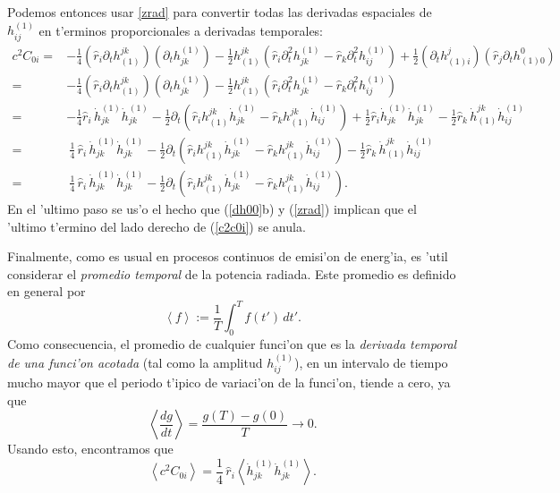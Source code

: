 Podemos entonces usar \eqref{zrad} para convertir todas las derivadas espaciales de $h^{(1)}_{ij}$ en t'erminos proporcionales a derivadas temporales:
\begin{align}
c^2C_{0i} = & -\frac{1}{4}(\hat{r}_i\partial_t h^{jk}_{(1)})(\partial_t h_{jk}^{(1)})
-\frac{1}{2}h^{jk}_{(1)}\left(\hat{r}_i\partial^2_t h^{(1)}_{jk}-\hat{r}_k\partial^2_t
h^{(1)}_{ij}\right)
+ \frac{1}{2}(\partial_t h^j_{(1)i})(\hat{r}_j \partial_t h^0_{(1)0})\\
= & -\frac{1}{4}(\hat{r}_i\partial_t h^{jk}_{(1)})(\partial_t h_{jk}^{(1)})
-\frac{1}{2}h^{jk}_{(1)}\left(\hat{r}_i\partial^2_t h^{(1)}_{jk}-\hat{r}_k\partial^2_t
h^{(1)}_{ij}\right) \\
= & -\frac{1}{4}\hat{r}_i\,\dot{h}_{jk}^{(1)}\dot{h}_{jk}^{(1)}
-\frac{1}{2}\partial_t\left(\hat{r}_i h^{jk}_{(1)}\dot{h}^{(1)}_{jk}-\hat{r}_kh^{jk}_{(1)}\dot{h}^{(1)}_{ij}\right)
+\frac{1}{2}\hat{r}_i\dot{h}^{(1)}_{jk}\dot{h}^{(1)}_{jk}
-\frac{1}{2}\hat{r}_k\,\dot{h}^{jk}_{(1)}\dot{h}^{(1)}_{ij}\\
= &\ \frac{1}{4}\,\hat{r}_i\,\dot{h}_{jk}^{(1)}\dot{h}_{jk}^{(1)} -\frac{1}{2}\partial_t\left(\hat{r}_i h^{jk}_{(1)}\dot{h}^{(1)}_{jk}-\hat{r}_kh^{jk}_{(1)}\dot{h}^{(1)}_{ij}\right)
-\frac{1}{2}\hat{r}_k\,\dot{h}^{jk}_{(1)}\dot{h}^{(1)}_{ij} \label{c2c0i}\\
= &\ \frac{1}{4}\,\hat{r}_i\,\dot{h}_{jk}^{(1)}\dot{h}_{jk}^{(1)}
-\frac{1}{2}\partial_t\left(\hat{r}_i h^{jk}_{(1)}\dot{h}^{(1)}_{jk} -\hat{r}_kh^{jk}_{(1)}\dot{h}^{(1)}_{ij}\right).
\end{align}
En el 'ultimo paso se us'o el hecho que (\ref{dh00}b) y (\ref{zrad}) implican que el 'ultimo t'ermino del lado derecho de (\ref{c2c0i}) se anula.

Finalmente, como es usual en procesos continuos de emisi'on de energ'ia, es 'util considerar el \textit{promedio temporal} de la potencia radiada. Este promedio es definido en general por
\begin{equation}
\left\langle f\right\rangle :=\frac{1}{T}\int_0^T f(t')\,dt'.
\end{equation}
Como consecuencia, el promedio de cualquier funci'on que es la \textit{derivada temporal de una funci'on acotada} (tal como la amplitud $h_{ij}^{(1)}$), en un intervalo de tiempo mucho mayor que el periodo t'ipico de variaci'on de la funci'on, tiende a cero, ya  que
\begin{equation}
\left\langle \frac{dg}{dt}\right\rangle=\frac{g(T)-g(0)}{T}\to 0.
\end{equation}
Usando esto, encontramos que
\begin{equation}
\left\langle c^2C_{0i}\right\rangle=\frac{1}{4}\,\hat{r}_i\left\langle\dot{h}_{jk}^{(1)}\dot{h}_{jk}^{(1)}\right\rangle .
\end{equation}

